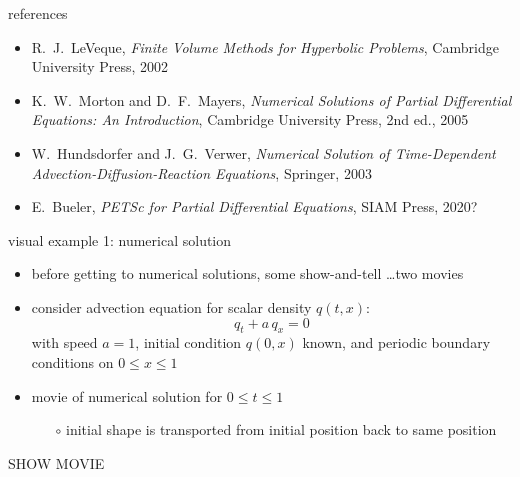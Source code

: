 \documentclass[10pt,hyperref,dvipsnames]{beamer}
\begin{document}
\begin{frame}{references}
\begin{itemize}
\item {\large \alert{R.~J.~LeVeque, \emph{Finite Volume Methods for Hyperbolic Problems}, Cambridge University Press, 2002}}

\bigskip
\item K.~W.~Morton and D.~F.~Mayers, \emph{Numerical Solutions of Partial Differential Equations: An Introduction}, Cambridge University Press, 2nd ed., 2005
\item W.~Hundsdorfer and J.~G.~Verwer, \emph{Numerical Solution of Time-Dependent Advection-Diffusion-Reaction Equations}, Springer, 2003
\item E.~Bueler, \emph{PETSc for Partial Differential Equations}, SIAM Press, 2020?
\end{itemize}
\end{frame}


\begin{frame}{visual example 1: numerical solution}

\begin{itemize}
\item before getting to numerical solutions, some show-and-tell \dots two movies
\item consider advection equation for scalar density $q(t,x)$:
    $$q_t + a \, q_x = 0$$
with speed $a=1$, initial condition $q(0,x)$ known, and periodic boundary conditions on $0\le x \le 1$
\item movie of numerical solution for $0\le t \le 1$
    \begin{itemize}
    \item[$\circ$] initial shape is transported from initial position back to same position
    \end{itemize}
\end{itemize}

\vspace{10mm}
\begin{center}
\alert{SHOW MOVIE}
\end{center}
\vspace{10mm}

\end{frame}
\end{document}
